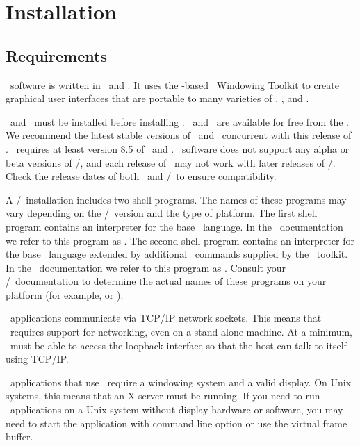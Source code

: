 \chapter{Installation}\label{sec:install}

\section{Requirements}\label{sec:install.requirements}
\OOMMF\ software is written in \Cplusplus\ and \Tcl.  It uses the \Tcl-based
\Tk\ Windowing Toolkit to create graphical user interfaces that are
portable to many varieties of \Unix, \Windows, and \MacOSX.

\Tcl\ and \Tk\ must be installed before installing \OOMMF.
\Tcl\ and \Tk\ are available for free from the
.
We recommend the latest stable
versions of \Tcl\ and \Tk\ concurrent with this release of \OOMMF.
\OOMMF\ requires
at least version 8.5 of \Tcl\ and \Tk.  \OOMMF\ software
does not support any alpha or beta versions of \Tcl/\Tk, and
each release of \OOMMF\ may not work with later releases of
\Tcl/\Tk.  Check the release dates of both \OOMMF\ and
\Tcl/\Tk\ to ensure compatibility.

A \Tcl/\Tk\ installation includes two shell programs.  The names of
these programs may vary depending on the \Tcl/\Tk\ version and the
type of platform.  The first shell program contains an interpreter
for the base \Tcl\ language.  In the \OOMMF\ documentation we refer
to this program as .
The second shell program contains
an interpreter for the base \Tcl\ language extended by additional
\Tcl\ commands supplied by the \Tk\ toolkit.  In the
\OOMMF\ documentation we refer to this program as
.
Consult your \Tcl/\Tk\ documentation to determine
the actual names of these programs on your platform (for example,
 or ).

\OOMMF\ applications communicate via TCP/IP network sockets.
This means that \OOMMF\ requires
support for networking, even
on a stand-alone machine.  At a minimum, \OOMMF\ must be able to
access the loopback interface so that the host can talk to
itself using TCP/IP.

\OOMMF\ applications that use \Tk\ require a windowing system and
a valid display.  On Unix systems, this means that an X server must
be running.  If you need to run \OOMMF\ applications on a Unix system
without display hardware or software, you may need to start the
application with command line option
or use the
virtual frame buffer.

